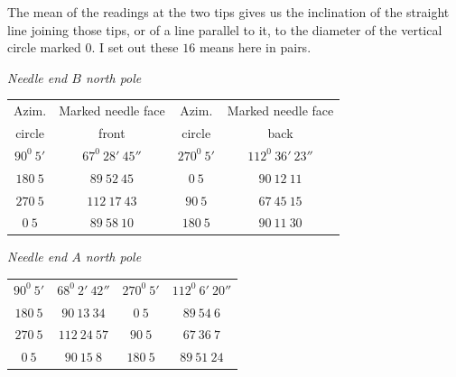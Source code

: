 The mean of the readings at the two tips gives us the inclination of the straight line joining those tips, or of a line parallel to it, to the diameter of the vertical circle marked $0$. I set out these $16$ means here in pairs.
\begin{center}
\textit{Needle end $B$ north pole}\par\smallskip
{\fontsize{9}{11}\selectfont
\begin{tabular}{c|c||c|c}
Azim.&Marked needle face&Azim.&Marked needle face\\
circle&front&circle&back\\\hline
$90^0\ 5'$&$67^0\ 28'\ 45''$&$270^0\ 5'$&$112^0\ 36'\ 23''$\\
$180\ 5$&$89\ 52\ 45$&$0\ 5$&$90\ 12\ 11$\\
$270\ 5$&$112\ 17\ 43$&$90\ 5$&$67\ 45\ 15$\\
$0\ 5$&$89\ 58\ 10$&$180\ 5$&$90\ 11\ 30$
\end{tabular}}
\par\medskip
\textit{Needle end $A$ north pole}\par\smallskip
{\fontsize{9}{11}\selectfont
\begin{tabular}{c|c||c|c}
$90^0\ 5'$&$68^0\ 2'\ 42''$&$270^0\ 5'$&$112^0\ 6'\ 20''$\\
$180\ 5$&$90\ 13\ 34$&$0\ 5$&$89\ 54\ 6$\\
$270\ 5$&$112\ 24\ 57$&$90\ 5$&$67\ 36\ 7$\\
$0\ 5$&$90\ 15\ 8$&$180\ 5$&$89\ 51\ 24$
\end{tabular}}
\end{center}

